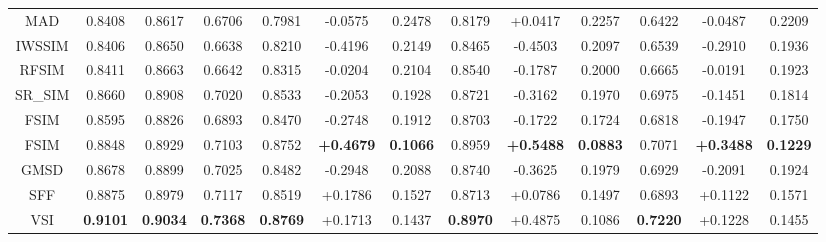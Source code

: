 \begin{table*}[htb]
\begin{tabular}{c|ccc|l|ccc|ccc|ccc}
MAD \cite{MAD}                       & 0.8408            & 0.8617            & \multicolumn{2}{c|}{0.6706}          & 0.7981          & -0.0575          & 0.2478          & 0.8179          & +0.0417          & 0.2257          & 0.6422          & -0.0487          & 0.2209          \\
IWSSIM \cite{IWSSIM}                     & 0.8406            & 0.8650            & \multicolumn{2}{c|}{0.6638}          & 0.8210          & -0.4196          & 0.2149          & 0.8465          & -0.4503          & 0.2097          & 0.6539          & -0.2910          & 0.1936  \\
RFSIM \cite{RFSIM}                      & 0.8411            & 0.8663            & \multicolumn{2}{c|}{0.6642}          & 0.8315          & -0.0204          & 0.2104          & 0.8540 & -0.1787          & 0.2000          & 0.6665          & -0.0191          & 0.1923          \\
SR\_SIM \cite{SRSIM}                   & 0.8660            & 0.8908            & \multicolumn{2}{c|}{0.7020}          & 0.8533          & -0.2053          & 0.1928          & 0.8721          & -0.3162          & 0.1970          & 0.6975          & -0.1451          & 0.1814          \\
FSIM \cite{FSIM}                      & 0.8595            & 0.8826            & \multicolumn{2}{c|}{0.6893}          & 0.8470          & -0.2748          & 0.1912          & 0.8703          & -0.1722          & 0.1724          & 0.6818          & -0.1947          & 0.1750          \\
FSIM \cite{FSIM}    & 0.8848            & 0.8929            & \multicolumn{2}{c|}{0.7103}          & 0.8752 & \textbf{+0.4679} & \textbf{0.1066} & 0.8959          & \textbf{+0.5488} & \textbf{0.0883} & 0.7071 & \textbf{+0.3488} & \textbf{0.1229} \\
GMSD \cite{GMSD}                      & 0.8678            & 0.8899            & \multicolumn{2}{c|}{0.7025}          & 0.8482          & -0.2948          & 0.2088          & 0.8740 & -0.3625          & 0.1979          & 0.6929          & -0.2091          & 0.1924          \\
SFF \cite{SFF}                        & 0.8875   & 0.8979   & \multicolumn{2}{c|}{0.7117} & 0.8519          & +0.1786 & 0.1527          & 0.8713          & +0.0786          & 0.1497          & 0.6893          & +0.1122          & 0.1571          \\
VSI \cite{VSI}                       & \textbf{0.9101}   & \textbf{0.9034}   & \multicolumn{2}{c|}{\textbf{0.7368}} & \textbf{0.8769} & +0.1713          & 0.1437 & \textbf{0.8970} & +0.4875          & 0.1086 & \textbf{0.7220} & +0.1228          & 0.1455          \\

\end{tabular}
\end{table*}
